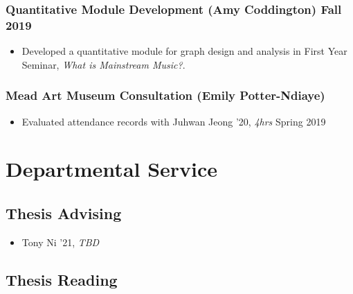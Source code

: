 \documentclass[
  fleqn, oneside]{article}
\providecommand{\tightlist}{%
  \setlength{\itemsep}{0pt}\setlength{\parskip}{0pt}}
\begin{document}
\hypertarget{quantitative-module-development-amy-coddington-fall-2019}{%
\subsubsection{\texorpdfstring{Quantitative Module Development (Amy
Coddington) \hfill\normalfont Fall
2019}{Quantitative Module Development (Amy Coddington) Fall 2019}}\label{quantitative-module-development-amy-coddington-fall-2019}}

\begin{itemize}
\tightlist
\item
  Developed a quantitative module for graph design and analysis in First
  Year Seminar, \emph{What is Mainstream Music?}. 
\end{itemize}

\hypertarget{mead-art-museum-consultation-emily-potter-ndiaye}{%
\subsubsection{Mead Art Museum Consultation (Emily
Potter-Ndiaye)}\label{mead-art-museum-consultation-emily-potter-ndiaye}}

\begin{itemize}
\tightlist
\item
  Evaluated attendance records with Juhwan Jeong '20, \emph{4hrs}
  \hfill Spring 2019
\end{itemize}

\hypertarget{departmental-service}{%
\section{Departmental Service}\label{departmental-service}}

\hypertarget{thesis-advising}{%
\subsection{Thesis Advising}\label{thesis-advising}}

\begin{itemize}
\tightlist
\item
  Tony Ni '21, \emph{TBD}
\end{itemize}

\hypertarget{thesis-reading}{%
\subsection{Thesis Reading}\label{thesis-reading}}
\end{document}
